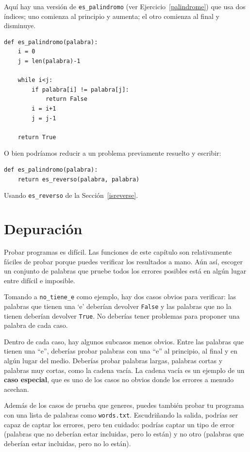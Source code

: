 \documentclass[10pt]{book}
\begin{document}
Aquí hay una versión de \verb"es_palindromo" (ver
Ejercicio~\ref{palindrome}) que usa dos índices; uno comienza al
principio y aumenta; el otro comienza al final y disminuye.

\begin{verbatim}
def es_palindromo(palabra):
    i = 0
    j = len(palabra)-1

    while i<j:
        if palabra[i] != palabra[j]:
            return False
        i = i+1
        j = j-1

    return True
\end{verbatim}

O bien podríamos reducir a un problema previamente
resuelto y escribir:

\begin{verbatim}
def es_palindromo(palabra):
    return es_reverso(palabra, palabra)
\end{verbatim}
%
Usando \verb"es_reverso" de la Sección~\ref{isreverse}.


\section{Depuración}

Probar programas es difícil.  Las funciones de este capítulo son
relativamente fáciles de probar porque puedes verificar los resultados a mano.
Aún así, escoger un conjunto de palabras que pruebe todos los errores posibles
está en algún lugar entre difícil e imposible.

Tomando a \verb"no_tiene_e" como ejemplo, hay dos casos obvios
para verificar: las palabras que tienen una `e' deberían devolver {\tt False} y
las palabras que no la tienen deberían devolver {\tt True}.  No deberías
tener problemas para proponer una palabra de cada caso.

Dentro de cada caso, hay algunos subcasos menos obvios.  Entre las
palabras que tienen una ``e'', deberías probar palabras con una ``e'' al
principio, al final y en algún lugar del medio.  Deberías probar palabras
largas, palabras cortas y palabras muy cortas, como la cadena vacía.  La
cadena vacía es un ejemplo de un {\bf caso especial}, que es uno de
los casos no obvios donde los errores a menudo acechan.

Además de los casos de prueba que generes, puedes también probar
tu programa con una lista de palabras como {\tt words.txt}.  Escudriñando
la salida, podrías ser capaz de captar los errores, pero ten cuidado:
podrías captar un tipo de error (palabras que no deberían estar
incluidas, pero lo están) y no otro (palabras que deberían estar incluidas,
pero no lo están).
\end{document}
